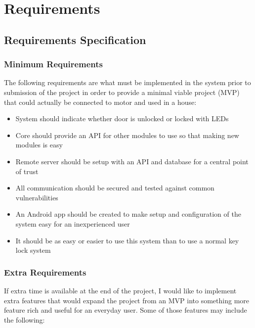 \chapter{Requirements}
\label{chap:requirements}

\section{Requirements Specification}

\subsection{Minimum Requirements}
The following requirements are what must be implemented in the system prior to submission of the project in order to provide a minimal viable project (MVP) that could actually be connected to motor and used in a house:

\begin{itemize}
	\item System should indicate whether door is unlocked or locked with LEDs
	\item Core should provide an API for other modules to use so that making new modules is easy
	\item Remote server should be setup with an API and database for a central point of trust
	\item All communication should be secured and tested against common vulnerabilities
	\item An Android app should be created to make setup and configuration of the system easy for an inexperienced user
	\item It should be as easy or easier to use this system than to use a normal key lock system
\end{itemize}

\subsection{Extra Requirements}

If extra time is available at the end of the project, I would like to implement extra features that would expand the project from an MVP into something more feature rich and useful for an everyday user. Some of those features may include the following:

